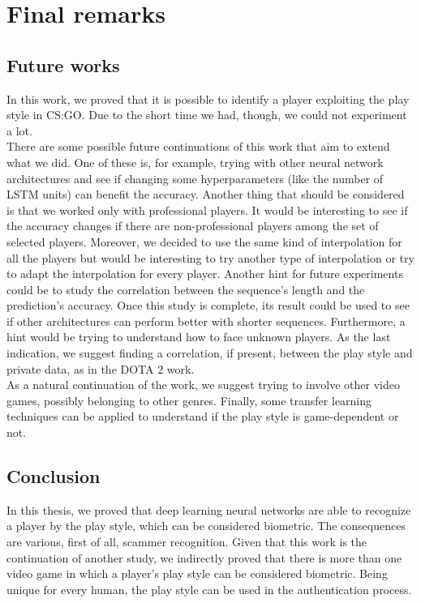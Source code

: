 
\chapter{Final remarks}
\label{cap:conclusioni}

\section {Future works}

	In this work, we proved that it is possible to identify a player exploiting the play style in CS:GO. 
	Due to the short time we had, though, we could not experiment a lot. \\
	There are some possible future continuations of this work that aim to extend what we did. 
	One of these is, for example, trying with other neural network architectures and see if changing some hyperparameters (like the number of LSTM units) can benefit the accuracy. 
	Another thing that should be considered is that we worked only with professional players. 
	It would be interesting to see if the accuracy changes if there are non-professional players among the set of selected players. 
	Moreover, we decided to use the same kind of interpolation for all the players but would be interesting to try another type of interpolation or try to adapt the interpolation for every player. 
	Another hint for future experiments could be to study the correlation between the sequence's length and the prediction's accuracy. 
	Once this study is complete, its result could be used to see if other architectures can perform better with shorter sequences. 
	Furthermore, a hint would be trying to understand how to face unknown players. 
	As the last indication, we suggest finding a correlation, if present, between the play style and private data, as in the DOTA 2 work. \\
	As a natural continuation of the work, we suggest trying to involve other video games, possibly belonging to other genres. 
	Finally, some transfer learning techniques can be applied to understand if the play style is game-dependent or not. 

\section{Conclusion}
	
	In this thesis, we proved that deep learning neural networks are able to recognize a player by the play style, which can be considered biometric. 
	The consequences are various, first of all, scammer recognition. 
	Given that this work is the continuation of another study, we indirectly proved that there is more than one video game in which a player's play style can be considered biometric. 
	Being unique for every human, the play style can be used in the authentication process.
